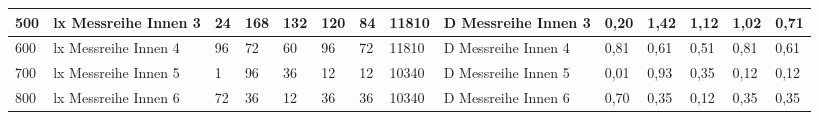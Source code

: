 \begin{table}[H]
{\begin{tabular}{|l|l|l|l|l|l|l|l|l|l|l|l|l|l|}
  \rowcolor[HTML]{C6E0B4} 
  500                                             & lx   Messreihe Innen 3                                    & 24                                & 168                               & 132                               & 120                               & 84                                & \cellcolor[HTML]{A9D08E}11810                                 & D   Messreihe Innen 3                                      & 0,20                                      & 1,42                                       & 1,12                                       & 1,02                                       & 0,71                                       \\ \hline
  \rowcolor[HTML]{E2EFDA} 
  600                                             & lx   Messreihe Innen 4                                    & 96                                & 72                                & 60                                & 96                                & 72                                & \cellcolor[HTML]{A9D08E}11810                                 & D   Messreihe Innen 4                                      & 0,81                                      & 0,61                                       & 0,51                                       & 0,81                                       & 0,61                                       \\ \hline
  \rowcolor[HTML]{C6E0B4} 
  700                                             & lx  Messreihe Innen 5                                     & 1                                 & 96                                & 36                                & 12                                & 12                                & \cellcolor[HTML]{A9D08E}10340                                 & D  Messreihe Innen 5                                       & 0,01                                      & 0,93                                       & 0,35                                       & 0,12                                       & 0,12                                       \\ \hline
  \rowcolor[HTML]{E2EFDA} 
  800                                             & lx   Messreihe Innen 6                                    & 72                                & 36                                & 12                                & 36                                & 36                                & \cellcolor[HTML]{A9D08E}10340                                 & D   Messreihe Innen 6                                      & 0,70                                      & 0,35                                       & 0,12                                       & 0,35                                       & 0,35                                       \\ \hline
  \end{tabular}%
  }
  \end{table}
